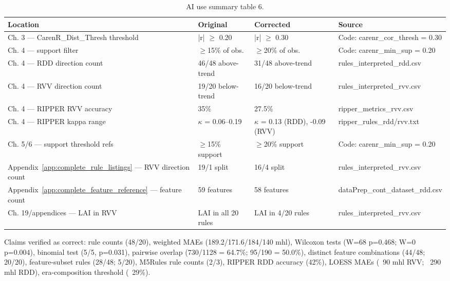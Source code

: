 \clearpage
\begin{table}[h!]
  \centering
  \caption{AI use summary table 6.}\label{tab:appe_6}
  \footnotesize
  \begin{adjustbox}{max width=\textwidth}
    \begin{tabularx}{\textwidth}{l|l|l|X}
  \toprule
  Location & Original & Corrected & Source \\
  \midrule
  Ch. 3 --- CarenR\_Dist\_Thresh threshold & |r| $\geq$ 0.20 & |r| $\geq$ 0.30 & Code: carenr\_cor\_thresh = 0.30 \\
  Ch. 4 --- support filter & $\geq$15\% of obs. & $\geq$20\% of obs. & Code: carenr\_min\_sup = 0.20 \\
  Ch. 4 --- RDD direction count & 46/48 above-trend & 31/48 above-trend & rules\_interpreted\_rdd.csv \\
  Ch. 4 --- RVV direction count & 19/20 below-trend & 16/20 below-trend & rules\_interpreted\_rvv.csv \\
  Ch. 4 --- RIPPER RVV accuracy & 35\% & 27.5\% & ripper\_metrics\_rvv.csv \\
  Ch. 4 --- RIPPER kappa range & $\kappa$ = 0.06--0.19 & $\kappa$ = 0.13 (RDD), -0.09 (RVV) & ripper\_rules\_rdd/rvv.txt \\
  Ch. 5/6 --- support threshold refs & $\geq$15\% support & $\geq$20\% support & Code: carenr\_min\_sup = 0.20 \\
  Appendix~\ref{app:complete_rule_listings} --- RVV direction count & 19/1 split & 16/4 split & rules\_interpreted\_rvv.csv \\
  Appendix~\ref{app:complete_feature_reference} --- feature count & 59 features & 58 features & dataPrep\_cont\_dataset\_rdd.csv \\
  Ch. 19/appendices --- LAI in RVV & LAI in all 20 rules & LAI in 4/20 rules & rules\_interpreted\_rvv.csv \\
  \bottomrule
\end{tabularx}
  \end{adjustbox}

\end{table}

Claims verified as correct: rule counts (48/20), weighted MAEs (189.2/171.6/184/140 mhl), Wilcoxon tests (W=68 p=0.468; W=0 p=0.004), binomial test (5/5, p=0.031), pairwise overlap (730/1128 = 64.7\%; 95/190 = 50.0\%), distinct feature combinations (44/48; 20/20), feature-subset rules (28/48; 5/20), M5Rules rule counts (2/3), RIPPER RDD accuracy (42\%), LOESS MAEs (~90 mhl RVV; ~290 mhl RDD), era-composition threshold (~29\%).


